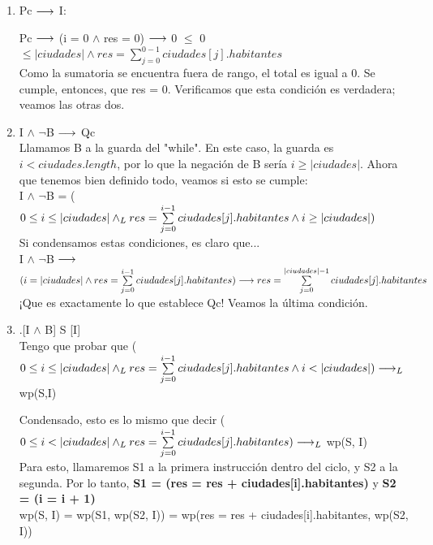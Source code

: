 \documentclass[10pt,a4paper]{article}
\begin{document}
\begin{enumerate} \setlength\itemsep{0cm}
	\item Pc $\longrightarrow$ I:
 
 Pc $\longrightarrow$ (i = 0 $\wedge$ res = 0) $\longrightarrow$ 0 $\leq$ 0 $\leq |ciudades| \wedge  res = \sum\limits_{j=0}^{0 - 1}ciudades[j].habitantes$ \\
 Como la sumatoria se encuentra fuera de rango, el total es igual a 0. Se cumple, entonces, que res = 0. Verificamos que esta condición es verdadera; veamos las otras dos.\\
 
	\item I $\wedge$  $\neg$B $\longrightarrow$ Qc  \\
 
 Llamamos B a la guarda del "while". En este caso, la guarda es $ i < ciudades.length$, por lo que la negación de B sería $i \geq |ciudades|$. Ahora que tenemos bien definido todo, veamos si esto se cumple: \\
    I $\wedge$  $\neg$B = ($0 \leq i \leq |ciudades| \land _L res = \sum\limits_{j=0}^{i - 1}ciudades[j].habitantes \wedge i \geq |ciudades|)$ \\
    Si condensamos estas condiciones, es claro que... \\
    I $\wedge$  $\neg$B $\longrightarrow$$ (i = |ciudades| \wedge res = \sum\limits_{j=0}^{i - 1}ciudades[j].habitantes) \longrightarrow res = \sum\limits_{j=0}^{|ciudades| - 1}ciudades[j].habitantes$\\
    ¡Que es exactamente lo que establece Qc! Veamos la última condición.\\
    
	\item .[I $\wedge$ B] S [I]\\
 Tengo que probar que {($0 \leq i \leq |ciudades| \land _L res = \sum\limits_{j=0}^{i - 1}ciudades[j].habitantes \wedge i < |ciudades|)  \longrightarrow _L$ wp(S,I)}
    
    Condensado, esto es lo mismo que decir ($0 \leq i < |ciudades| \land _L res = \sum\limits_{j=0}^{i - 1}ciudades[j].habitantes) \longrightarrow _L$ wp(S, I)\\
    
    Para esto, llamaremos S1 a la primera instrucción dentro del ciclo, y S2 a la segunda. Por lo tanto, \textbf{S1 = (res = res + ciudades[i].habitantes)} y \textbf{S2 = (i = i + 1)}\\
        
    wp(S, I) = wp(S1, wp(S2, I)) = wp(res = res + ciudades[i].habitantes, wp(S2, I))\\
    

\end{enumerate}
\end{document}
